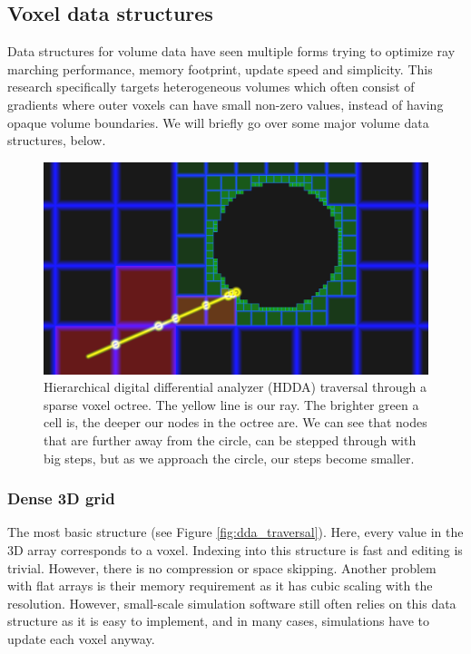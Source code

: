 \subsection{Voxel data structures} \label{related_work:voxel_data_structures}
Data structures for volume data have seen multiple forms trying to optimize ray marching performance, memory footprint, update speed and simplicity. This research specifically targets heterogeneous volumes which often consist of gradients where outer voxels can have small non-zero values, instead of having opaque volume boundaries. We will briefly go over some major volume data structures, below.

\begin{figure}
    \centering
    \includegraphics[width=\linewidth]{figures/esvo_traversal.png}
    \caption{Hierarchical digital differential analyzer (HDDA) traversal through a sparse voxel octree. The yellow line is our ray. The brighter green a cell is, the deeper our nodes in the octree are. We can see that nodes that are further away from the circle, can be stepped through with big steps, but as we approach the circle, our steps become smaller. \cite{ShaderToyQuadtree}}
    \label{fig:esvo}
\end{figure}




\subsubsection{Dense 3D grid} \label{related_work:voxel_data_structures:dense_grid}
The most basic structure (see Figure \ref{fig:dda_traversal}). Here, every value in the 3D array corresponds to a voxel. Indexing into this structure is fast and editing is trivial. However, there is no compression or space skipping. Another problem with flat arrays is their memory requirement as it has cubic scaling with the resolution. However, small-scale simulation software still often relies on this data structure as it is easy to implement, and in many cases, simulations have to update each voxel anyway.



